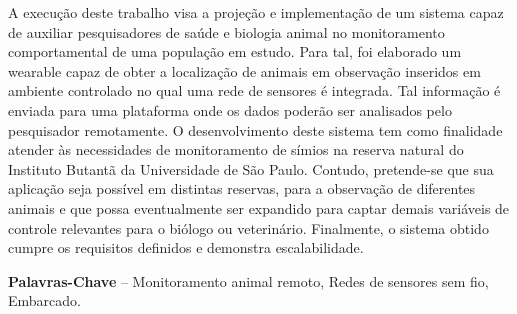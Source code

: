 \begin{resumo}
A execução deste trabalho visa a projeção e implementação de um sistema capaz de auxiliar pesquisadores de saúde e biologia animal no monitoramento comportamental de uma população em estudo. Para tal, foi elaborado um wearable capaz de obter a localização de animais em observação inseridos em ambiente controlado no qual uma rede de sensores é integrada. Tal informação é enviada para uma plataforma onde os dados poderão ser analisados pelo pesquisador remotamente. O desenvolvimento deste sistema tem como finalidade atender às necessidades de monitoramento de símios na reserva natural do Instituto Butantã da Universidade de São Paulo. Contudo, pretende-se que sua aplicação seja possível em distintas reservas, para a observação de diferentes animais e que possa eventualmente ser expandido para captar demais variáveis de controle relevantes para o biólogo ou veterinário. Finalmente, o sistema obtido cumpre os requisitos definidos e demonstra escalabilidade.

\textbf{Palavras-Chave} -- Monitoramento animal remoto, Redes de sensores sem fio, Embarcado.
\end{resumo}
